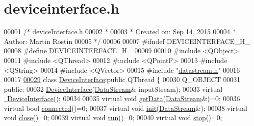 \hypertarget{deviceinterface_8h_source}{}\section{deviceinterface.\+h}
\label{deviceinterface_8h_source}

\begin{DoxyCode}
00001 \textcolor{comment}{/* deviceInterface.h}
00002 \textcolor{comment}{ *}
00003 \textcolor{comment}{ *  Created on: Sep 14, 2015}
00004 \textcolor{comment}{ *      Author: Martin Rostin}
00005 \textcolor{comment}{ */}
00006 
00007 \textcolor{preprocessor}{#ifndef DEVICEINTERFACE\_H\_}
00008 \textcolor{preprocessor}{#define DEVICEINTERFACE\_H\_}
00009 
00010 \textcolor{preprocessor}{#include <QObject>}
00011 \textcolor{preprocessor}{#include <QThread>}
00012 \textcolor{preprocessor}{#include <QPointF>}
00013 \textcolor{preprocessor}{#include <QString>}
00014 \textcolor{preprocessor}{#include <QVector>}
00015 \textcolor{preprocessor}{#include "\hyperlink{datastream_8h}{datastream.h}"}
00016 
00017 
\hypertarget{deviceinterface_8h_source.tex_l00029}{}\hyperlink{classDeviceInterface}{00029} \textcolor{keyword}{class }\hyperlink{classDeviceInterface}{DeviceInterface}:\textcolor{keyword}{public} QThread \{
00030     Q\_OBJECT
00031 \textcolor{keyword}{public}:
00032     \hyperlink{classDeviceInterface_a9923935a7fa7b3134568ec7fd97705e3}{DeviceInterface}(\hyperlink{classDataStream}{DataStream}& inputStream);
00033     \textcolor{keyword}{virtual} \hyperlink{classDeviceInterface_a668a221c7a77701e25719f406d407746}{~DeviceInterface}();
00034 
00035     \textcolor{keyword}{virtual} \textcolor{keywordtype}{void} \hyperlink{classDeviceInterface_aeaf032ef412df905fe4f2609cc284887}{getData}(\hyperlink{classDataStream}{DataStream}&)=0;
00036     \textcolor{keyword}{virtual} \textcolor{keywordtype}{bool} \hyperlink{classDeviceInterface_a4c7fa83218b6a7c5700cb75253b2165e}{connected}()=0;
00037     \textcolor{keyword}{virtual} \textcolor{keywordtype}{void} \hyperlink{classDeviceInterface_a03e9c1bfeabe1a97f05bf9107b89ae67}{init}(\hyperlink{classDataStream}{DataStream}&);
00038     \textcolor{keyword}{virtual} \textcolor{keywordtype}{void} \hyperlink{classDeviceInterface_a08473443413b1725a3930aace12e2837}{close}()=0;
00039     \textcolor{keyword}{virtual} \textcolor{keywordtype}{void} \hyperlink{classDeviceInterface_a6511c2845f5198acc94f5d7dd21cae57}{run}()=0;
00040     \textcolor{keyword}{virtual} \textcolor{keywordtype}{void} \hyperlink{classDeviceInterface_a101b3b53a01add866737920e03a850a8}{stop}()=0;

\end{DoxyCode}
